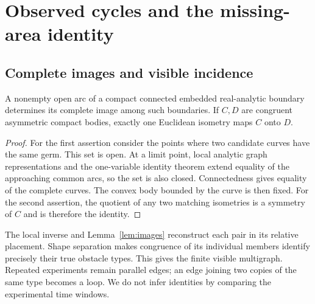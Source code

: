 \section{Observed cycles and the missing-area identity}\label{sec:completion}
\subsection{Complete images and visible incidence}
\begin{lemma}\label{lem:images}
A nonempty open arc of a compact connected embedded real-analytic
boundary determines its complete image among such boundaries. If $C,D$
are congruent asymmetric compact bodies, exactly one Euclidean isometry
maps $C$ onto $D$.
\end{lemma}
\begin{proof}
For the first assertion consider the points where two candidate curves
have the same germ. This set is open. At a limit point, local analytic
graph representations and the one-variable identity theorem extend
equality of the approaching common arcs, so the set is also closed.
Connectedness gives equality of the complete curves. The convex body
bounded by the curve is then fixed. For the second assertion, the
quotient of any two matching isometries is a symmetry of $C$ and is
therefore the identity.
\end{proof}

The local inverse and Lemma~\ref{lem:images} reconstruct each pair in
its relative placement. Shape separation makes congruence of its
individual members identify precisely their true obstacle types. This
gives the finite visible multigraph. Repeated experiments remain parallel
edges; an edge joining two copies of the same type becomes a loop.
We do not infer identities by comparing the experimental time windows.

